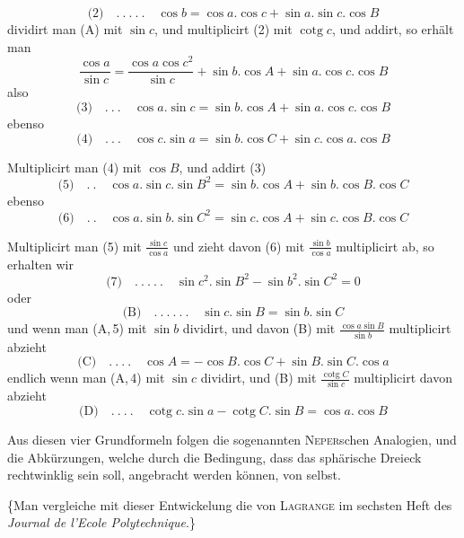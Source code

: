%
\[
\text{(2)}\quad .\ .\ .\ .\ .\quad\cos b=\cos a.\cos c+\sin a.\sin c.\cos B
\]
dividirt man (A) mit \(\sin c\), und multiplicirt (2) mit \(\operatorname{cotg}c\), und addirt, so erhält man
\[
\frac{\cos a}{\sin c}=\frac{\cos a\cos c^2}{\sin c}+\sin b.\cos A+\sin a.\cos c.\cos B
\]
also
\[
\text{(3)}\quad .\ .\ .\quad\cos a.\sin c=\sin b.\cos A+\sin a.\cos c.\cos B
\]
ebenso
\[
\text{(4)}\quad .\ .\ .\quad\cos c.\sin a=\sin b.\cos C+\sin c.\cos a.\cos B
\]
\par
Multiplicirt man (4) mit \(\cos B\), und addirt (3)
\[
\text{(5)}\quad .\ .\quad\cos a.\sin c.\sin B^2=\sin b.\cos A+\sin b.\cos B.\cos C
\]
ebenso
\[
\text{(6)}\quad .\ .\quad\cos a.\sin b.\sin C^2=\sin c.\cos A+\sin c.\cos B.\cos C
\]
\par
Multiplicirt man (5) mit \(\frac{\sin c}{\cos a}\) und zieht davon (6) mit \(\frac{\sin b}{\cos a}\) multiplicirt ab, so erhalten wir
\[
\text{(7)}\quad .\ .\ .\ .\ .\quad\sin c^2.\sin B^2-\sin b^2.\sin C^2=0
\]
oder
\[
\text{(B)}\quad .\ .\ .\ .\ .\ .\quad\sin c.\sin B=\sin b.\sin C
\]
und wenn man (A,\,5) mit \(\sin b\) dividirt, und davon (B) mit \(\frac{\cos a\sin B}{\sin b}\) multiplicirt abzieht
\[
\text{(C)}\quad .\ .\ .\ .\quad\cos A=-\cos B.\cos C+\sin B.\sin C.\cos a
\]
endlich wenn man (A,\,4) mit \(\sin c\) dividirt, und (B) mit \(\frac{\operatorname{cotg}C}{\sin c}\) multiplicirt davon abzieht
\[
\text{(D)}\quad .\ .\ .\ .\quad\operatorname{cotg}c.\sin a-\operatorname{cotg}C.\sin B=\cos a.\cos B
\]
\par
Aus diesen vier Grundformeln folgen die sogenannten \textsc{Neper}schen Analogien, und die Abkürzungen, welche durch die Bedingung, dass das sphärische Dreieck rechtwinklig sein soll, angebracht werden können, von selbst.

\{Man vergleiche mit dieser Entwickelung die von \textsc{Lagrange} im sechsten Heft des \textit{Journal de l’Ecole Polytechnique}.\}
